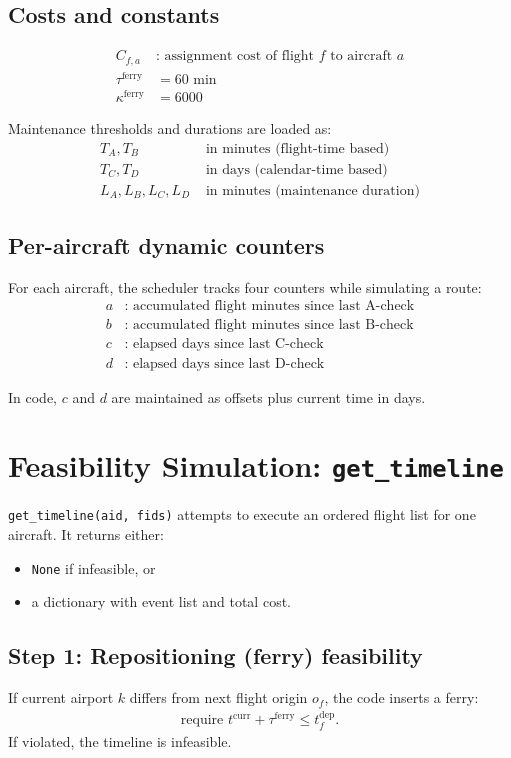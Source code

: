 \documentclass[11pt,a4paper]{article}
\begin{document}
\subsection{Costs and constants}
\begin{align*}
C_{f,a} &\text{: assignment cost of flight } f \text{ to aircraft } a\\
\tau^{\text{ferry}} &= 60 \text{ min}\\
\kappa^{\text{ferry}} &= 6000
\end{align*}

Maintenance thresholds and durations are loaded as:
\begin{align*}
T_A,T_B &\text{ in minutes (flight-time based)}\\
T_C,T_D &\text{ in days (calendar-time based)}\\
L_A,L_B,L_C,L_D &\text{ in minutes (maintenance duration)}
\end{align*}

\subsection{Per-aircraft dynamic counters}
For each aircraft, the scheduler tracks four counters while simulating a route:
\begin{align*}
a &\text{: accumulated flight minutes since last A-check}\\
b &\text{: accumulated flight minutes since last B-check}\\
c &\text{: elapsed days since last C-check}\\
d &\text{: elapsed days since last D-check}
\end{align*}

In code, $c$ and $d$ are maintained as offsets plus current time in days.

\section{Feasibility Simulation: \texttt{get\_timeline}}
\texttt{get\_timeline(aid, fids)} attempts to execute an ordered flight list for one aircraft. It returns either:
\begin{itemize}[leftmargin=1.4em]
    \item \texttt{None} if infeasible, or
    \item a dictionary with event list and total cost.
\end{itemize}

\subsection{Step 1: Repositioning (ferry) feasibility}
If current airport $k$ differs from next flight origin $o_f$, the code inserts a ferry:
\begin{align*}
\text{require } t^{\text{curr}} + \tau^{\text{ferry}} \le t_f^{\text{dep}}.
\end{align*}
If violated, the timeline is infeasible.
\end{document}
